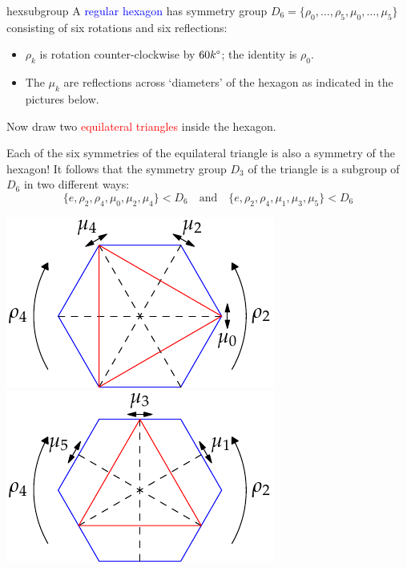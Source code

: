 \begin{example}[lower separated=false, sidebyside, sidebyside align=top seam, sidebyside gap=0pt, righthand width=0.35\linewidth]{}{hexsubgroup}
A \textcolor{blue}{regular hexagon} has symmetry group $D_6=\{\rho_0,\ldots,\rho_5,\mu_0,\ldots,\mu_5\}$ consisting of six rotations and six reflections:
\begin{itemize}
  \item $\rho_k$ is rotation counter-clockwise by $\ang{60k}$; the identity is $\rho_0$.
  \item The $\mu_k$ are reflections across `diameters' of the hexagon as indicated in the pictures below.
\end{itemize}

Now draw two \textcolor{red}{equilateral triangles} inside the hexagon.

Each of the six symmetries of the equilateral triangle is also a symmetry of the hexagon! It follows that the symmetry group $D_3$ of the triangle is a subgroup of $D_6$ in two different ways:
\[\{e,\rho_2,\rho_4,\mu_0,\mu_2,\mu_4\}< D_6\quad\text{and}\quad \{e,\rho_2,\rho_4,\mu_1,\mu_3,\mu_5\}< D_6\]

\tcblower
\flushright\includegraphics[scale=0.95]{group-hexagon1}\\
\includegraphics[scale=0.95]{group-hexagon2}
\end{example}



